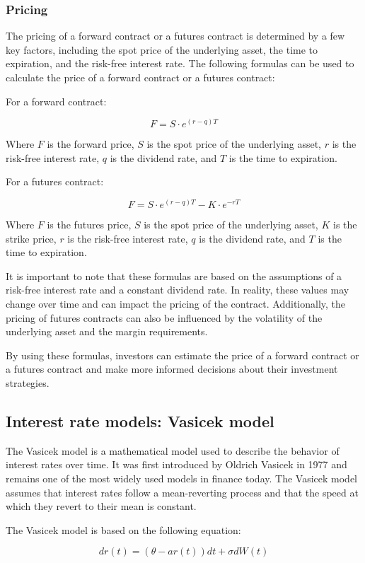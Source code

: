 \documentclass[12pt, a4paper, oneside]{article}
\begin{document}
\subsubsection{Pricing}
The pricing of a forward contract or a futures contract is determined by a few key factors, including the spot price of the underlying asset, the time to expiration, and the risk-free interest rate. The following formulas can be used to calculate the price of a forward contract or a futures contract:

For a forward contract:

$$F = S\cdot e^{(r-q)T}$$

Where $F$ is the forward price, $S$ is the spot price of the underlying asset, $r$ is the risk-free interest rate, $q$ is the dividend rate, and $T$ is the time to expiration.

For a futures contract:

$$F = S\cdot e^{(r-q)T} - K\cdot e^{-rT}$$

Where $F$ is the futures price, $S$ is the spot price of the underlying asset, $K$ is the strike price, $r$ is the risk-free interest rate, $q$ is the dividend rate, and $T$ is the time to expiration.

It is important to note that these formulas are based on the assumptions of a risk-free interest rate and a constant dividend rate. In reality, these values may change over time and can impact the pricing of the contract. Additionally, the pricing of futures contracts can also be influenced by the volatility of the underlying asset and the margin requirements.

By using these formulas, investors can estimate the price of a forward contract or a futures contract and make more informed decisions about their investment strategies.
\subsection{ Interest rate models: Vasicek model }

The Vasicek model is a mathematical model used to describe the behavior of interest rates over time. It was first introduced by Oldrich Vasicek in 1977 and remains one of the most widely used models in finance today. The Vasicek model assumes that interest rates follow a mean-reverting process and that the speed at which they revert to their mean is constant.

The Vasicek model is based on the following equation:

$$dr(t) = (\theta - a r(t))dt + \sigma dW(t)$$
\end{document}
